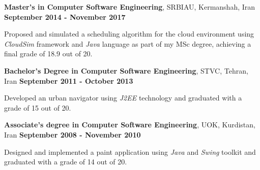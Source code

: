 
\begin{scholarship}
\scholarshipentry{}
{\textbf{Master's in Computer Software Engineering}, SRBIAU, Kermanshah, Iran \hspace{63 pt } \textbf{September 2014 - November 2017}

Proposed and simulated a scheduling algorithm for the cloud environment using \textit{CloudSim} framework and \textit{Java} language as part of my MSc degree, achieving a final grade of 18.9 out of 20. \vspace{5 pt}
}
\scholarshipentry{}
				{\textbf{Bachelor's Degree in Computer Software Engineering}, STVC, Tehran, Iran \hspace{69 pt} \textbf{September 2011 - October 2013}
 
Developed an urban navigator using \textit{J2EE} technology and graduated with a grade of 15 out of 20. \vspace{5 pt}	
}		
\scholarshipentry{}
				{\textbf{Associate's degree in Computer Software Engineering}, UOK, Kurdistan, Iran \hspace{50 pt} \textbf{September 2008 - November 2010}

Designed and implemented a paint application using \textit{Java} and \textit{Swing} toolkit and graduated with a grade of 14 out of 20.
}
\end{scholarship}
